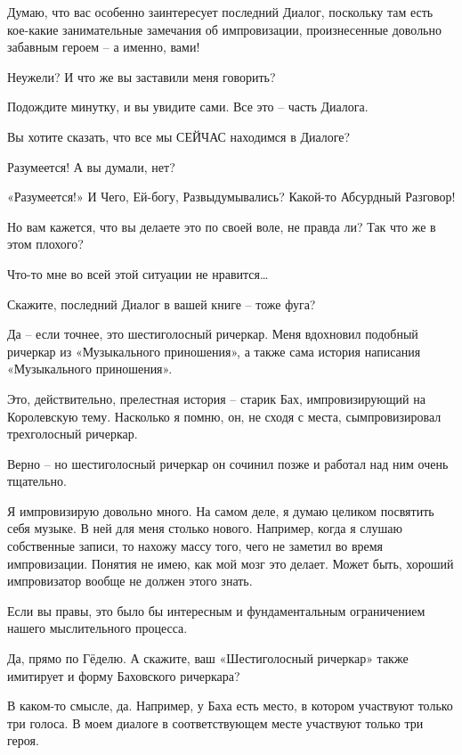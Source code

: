 \documentclass[../main.tex]{subfiles}
\begin{document}
\begin{dialogue}
 Думаю, что вас особенно заинтересует последний Диалог, поскольку там есть кое-какие занимательные замечания об импровизации, произнесенные довольно забавным героем \--- а именно, вами!

 Неужели? И что же вы заставили меня говорить?

 Подождите минутку, и вы увидите сами. Все это \--- часть Диалога.

 Вы хотите сказать, что все мы СЕЙЧАС находимся в Диалоге?

 Разумеется! А вы думали, нет?

 «Разумеется!» И Чего, Ей-богу, Развыдумывались? Какой-то Абсурдный Разговор!

 Но вам кажется, что вы делаете это по своей воле, не правда ли? Так что же в этом плохого?

 Что-то мне во всей этой ситуации не нравится\ldots{}

 Скажите, последний Диалог в вашей книге \--- тоже фуга?

 Да \--- если точнее, это шестиголосный ричеркар. Меня вдохновил подобный ричеркар из «Музыкального приношения», а также сама история написания «Музыкального приношения».

 Это, действительно, прелестная история \--- старик Бах, импровизирующий на Королевскую тему. Насколько я помню, он, не сходя с места, сымпровизировал трехголосный ричеркар.

 Верно \--- но шестиголосный ричеркар он сочинил позже и работал над ним очень тщательно.

 Я импровизирую довольно много. На самом деле, я думаю целиком посвятить себя музыке. В ней для меня столько нового. Например, когда я слушаю собственные записи, то нахожу массу того, чего не заметил во время импровизации. Понятия не имею, как мой мозг это делает. Может быть, хороший импровизатор вообще не должен этого знать.

 Если вы правы, это было бы интересным и фундаментальным ограничением нашего мыслительного процесса.

 Да, прямо по Гёделю. А скажите, ваш «Шестиголосный ричеркар» также имитирует и форму Баховского ричеркара?

 В каком-то смысле, да. Например, у Баха есть место, в котором участвуют только три голоса. В моем диалоге в соответствующем месте участвуют только три героя.


\end{dialogue}
\end{document}
